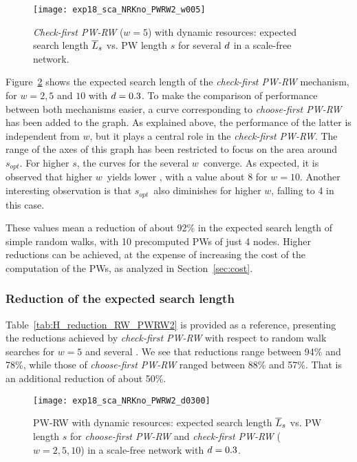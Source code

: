 \documentclass[]{elsarticle}
\newcommand{\s}		{\ensuremath{s}}		\newcommand{\sopt}	{\ensuremath{s_{opt}}}		\newcommand{\p}		{\ensuremath{p}}		\newcommand{\W}		{\ensuremath{W}}		\newcommand{\w}		{\ensuremath{w}}		\newcommand{\lsave}	{\ensuremath{\overline{l}_s}}	\newcommand{\lave}	{\ensuremath{\overline{l}}}	\newcommand{\lopt}	{\ensuremath{\overline{l}_{opt}}}
\begin{document}
\begin{figure}
 \centering
 \texttt{[image: exp18\_sca\_NRKno\_PWRW2\_w005]}
 \caption{\emph{Check-first PW-RW} ($\w=5$) with dynamic resources: expected search length $\overline{L}_s$ vs. PW length $\s$ for several $d$ in a scale-free network.}
 \label{fig:scalefree_pw2}
\end{figure}

Figure~\ref{fig:scalefree_pw1_pw2} shows the expected search length of the \emph{check-first PW-RW} mechanism, for $\w=2, 5$ and $10$ with $d=0.3$. To make the comparison of performance between both mechanisms easier, a curve corresponding to \emph{choose-first PW-RW} has been added to the graph. As explained above, the performance of the latter is independent from \w, but it plays a central role in the \emph{check-first PW-RW}. The range of the axes of this graph has been restricted to focus on the area around \sopt. For higher \s, the curves for the several \w\ converge.
As expected, it is observed that higher \w\ yields lower \Lexpopt, with a value about 8 for $\w=10$. Another interesting observation is that \sopt\ also diminishes for higher \w, falling to 4 in this case. 

These values mean a reduction of about 92\% in the expected search length of simple random walks, with 10 precomputed PWs of just 4 nodes. Higher reductions can be achieved, at the expense of increasing the cost of the computation of the PWs, as analyzed in Section~\ref{sec:cost}. \\


\subsubsection{Reduction of the expected search length}

Table~\ref{tab:H_reduction_RW_PWRW2} is provided as a reference, presenting the reductions achieved by \emph{check-first PW-RW} with respect to random walk searches for $\w=5$  and several \pd. We see that reductions range between 94\% and 78\%, while those of \emph{choose-first PW-RW} ranged between 88\% and 57\%. That is an additional reduction of about 50\%.

\begin{figure}
 \centering
 \texttt{[image: exp18\_sca\_NRKno\_PWRW2\_d0300]}
 \caption{PW-RW with dynamic resources: expected search length $\overline{L}_s$ vs. PW length $\s$ for \emph{choose-first PW-RW} and \emph{check-first PW-RW} ($\w = 2, 5, 10$) in a scale-free network with $d=0.3$.}
 \label{fig:scalefree_pw1_pw2}
\end{figure}
\end{document}
